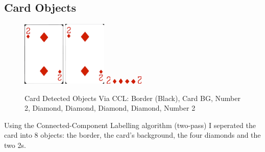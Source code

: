 \documentclass[conference]{IEEEtran}
\begin{document}
\subsection{Card Objects}
\begin{figure}[htbp]
    \centerline{
        {\includegraphics[width=20mm, scale=0.5]{./figures/task 3/card/DetectedObject-1.png}}
        {\includegraphics[width=20mm, scale=0.5]{./figures/task 3/card/DetectedObject-2.png}}
        {\includegraphics[width=2mm, scale=0.5]{./figures/task 3/card/DetectedObject-3.png}}
        {\includegraphics[width=2mm, scale=0.5]{./figures/task 3/card/DetectedObject-4.png}}
        {\includegraphics[width=2mm, scale=0.5]{./figures/task 3/card/DetectedObject-5.png}}
        {\includegraphics[width=2mm, scale=0.5]{./figures/task 3/card/DetectedObject-6.png}}
        {\includegraphics[width=2mm, scale=0.5]{./figures/task 3/card/DetectedObject-7.png}}
        {\includegraphics[width=2mm, scale=0.5]{./figures/task 3/card/DetectedObject-8.png}}
    }
    \caption{Card Detected Objects Via CCL: Border (Black), Card BG, Number 2, Diamond, Diamond, Diamond, Diamond, Number 2}
    \label{fig}
\end{figure}
Using the Connected-Component Labelling algorithm (two-pass) I seperated the card into 8 objects: the border, the card's background, the four diamonds and the two 2s.
\end{document}
